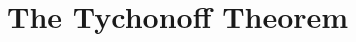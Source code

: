 \documentclass[../main.tex]{subfiles}
\begin{document}
\chapter{The Tychonoff Theorem}
\end{document}
